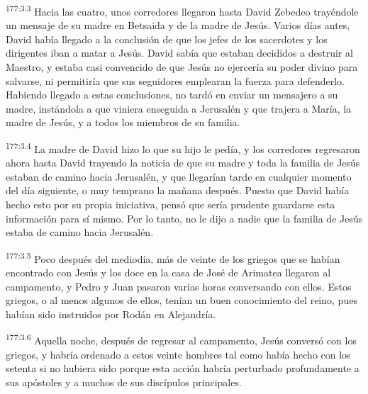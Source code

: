 \par
\textsuperscript{177:3.3} Hacia las cuatro, unos corredores llegaron hasta David Zebedeo trayéndole un mensaje de su madre en Betsaida y de la madre de Jesús. Varios días antes, David había llegado a la conclusión de que los jefes de los sacerdotes y los dirigentes iban a matar a Jesús. David sabía que estaban decididos a destruir al Maestro, y estaba casi convencido de que Jesús no ejercería su poder divino para salvarse, ni permitiría que sus seguidores emplearan la fuerza para defenderlo. Habiendo llegado a estas conclusiones, no tardó en enviar un mensajero a su madre, instándola a que viniera enseguida a Jerusalén y que trajera a María, la madre de Jesús, y a todos los miembros de su familia.

\par
\textsuperscript{177:3.4} La madre de David hizo lo que su hijo le pedía, y los corredores regresaron ahora hasta David trayendo la noticia de que su madre y toda la familia de Jesús estaban de camino hacia Jerusalén, y que llegarían tarde en cualquier momento del día siguiente, o muy temprano la mañana después. Puesto que David había hecho esto por su propia iniciativa, pensó que sería prudente guardarse esta información para sí mismo. Por lo tanto, no le dijo a nadie que la familia de Jesús estaba de camino hacia Jerusalén.

\par
\textsuperscript{177:3.5} Poco después del mediodía, más de veinte de los griegos que se habían encontrado con Jesús y los doce en la casa de José de Arimatea llegaron al campamento, y Pedro y Juan pasaron varias horas conversando con ellos. Estos griegos, o al menos algunos de ellos, tenían un buen conocimiento del reino, pues habían sido instruidos por Rodán en Alejandría.

\par
\textsuperscript{177:3.6} Aquella noche, después de regresar al campamento, Jesús conversó con los griegos, y habría ordenado a estos veinte hombres tal como había hecho con los setenta si no hubiera sido porque esta acción habría perturbado profundamente a sus apóstoles y a muchos de sus discípulos principales.

